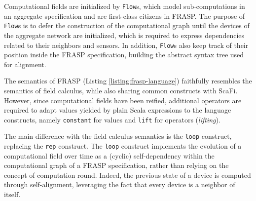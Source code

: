 Computational fields are initialized by \texttt{Flow}s, which model
sub-computations in an aggregate specification and are first-class citizens in
FRASP. The purpose of \texttt{Flow}s is to defer the construction of the
computational graph until the devices of the aggregate network are initialized,
which is required to express dependencies related to their neighbors and
sensors. In addition, \texttt{Flow}s also keep track of their position inside
the FRASP specification, building the abstract syntax tree used for alignment.

The semantics of FRASP (Listing \ref{listing:frasp-language}) faithfully
resembles the semantics of field calculus, while also sharing common constructs
with \ac{ScaFi}. However, since computational fields have been reified,
additional operators are required to adapt values yielded by plain Scala
expressions to the language constructs, namely \texttt{constant} for values and
\texttt{lift} for operators (\textit{lifting}).

The main difference with the field calculus semantics is the \texttt{loop}
construct, replacing the \texttt{rep} construct. The \texttt{loop} construct
implements the evolution of a computational field over time as a (cyclic)
self-dependency within the computational graph of a FRASP specification, rather
than relying on the concept of computation round. Indeed, the previous state of
a device is computed through self-alignment, leveraging the fact that every
device is a neighbor of itself.




